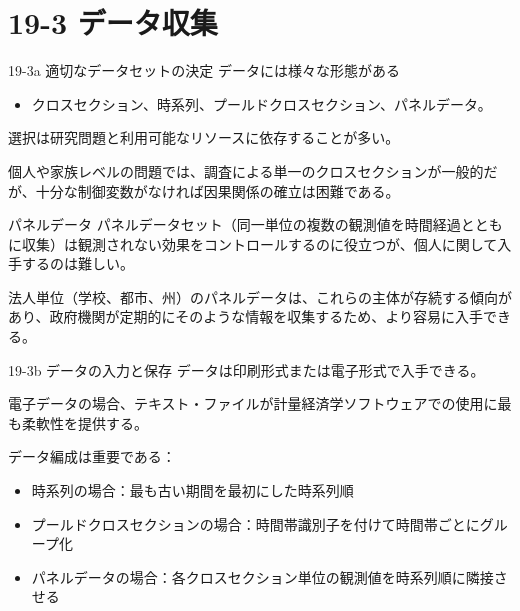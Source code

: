 \documentclass[
  ignorenonframetext,
]{beamer}
\providecommand{\tightlist}{%
  \setlength{\itemsep}{0pt}\setlength{\parskip}{0pt}}
\begin{document}
\section{19-3 データ収集}\label{ux30c7ux30fcux30bfux53ceux96c6}

\begin{frame}{19-3a 適切なデータセットの決定}
\label{a-ux9069ux5207ux306aux30c7ux30fcux30bfux30bbux30c3ux30c8ux306eux6c7aux5b9a}
データには様々な形態がある

\begin{itemize}
\tightlist
\item
  クロスセクション、時系列、プールドクロスセクション、パネルデータ。
\end{itemize}

選択は研究問題と利用可能なリソースに依存することが多い。

個人や家族レベルの問題では、調査による単一のクロスセクションが一般的だが、十分な制御変数がなければ因果関係の確立は困難である。
\end{frame}

\begin{frame}{パネルデータ}
\label{ux30d1ux30cdux30ebux30c7ux30fcux30bf}
パネルデータセット（同一単位の複数の観測値を時間経過とともに収集）は観測されない効果をコントロールするのに役立つが、個人に関して入手するのは難しい。

法人単位（学校、都市、州）のパネルデータは、これらの主体が存続する傾向があり、政府機関が定期的にそのような情報を収集するため、より容易に入手できる。
\end{frame}

\begin{frame}{19-3b データの入力と保存}
\label{b-ux30c7ux30fcux30bfux306eux5165ux529bux3068ux4fddux5b58}
データは印刷形式または電子形式で入手できる。

電子データの場合、テキスト・ファイルが計量経済学ソフトウェアでの使用に最も柔軟性を提供する。

データ編成は重要である：

\begin{itemize}
\tightlist
\item
  時系列の場合：最も古い期間を最初にした時系列順
\item
  プールドクロスセクションの場合：時間帯識別子を付けて時間帯ごとにグループ化
\item
  パネルデータの場合：各クロスセクション単位の観測値を時系列順に隣接させる
\end{itemize}
\end{frame}
\end{document}

